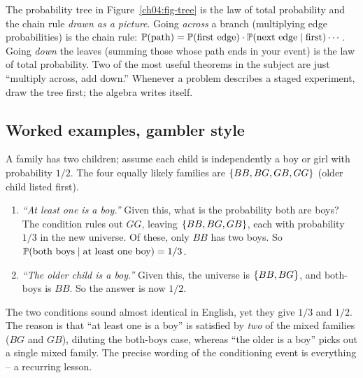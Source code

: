 \begin{aestheticbox}
The probability tree in Figure~\ref{ch04:fig-tree} is the law of total probability and the chain rule \emph{drawn as a picture}. Going \emph{across} a branch (multiplying edge probabilities) is the chain rule: $\operatorname{\mathbb{P}}(\text{path}) = \operatorname{\mathbb{P}}(\text{first edge})\cdot\operatorname{\mathbb{P}}(\text{next edge}\mid \text{first})\cdots$. Going \emph{down} the leaves (summing those whose path ends in your event) is the law of total probability. Two of the most useful theorems in the subject are just ``multiply across, add down.'' Whenever a problem describes a staged experiment, draw the tree first; the algebra writes itself.
\end{aestheticbox}

\subsection{Worked examples, gambler style}

\begin{example}
\label{ch04:ex-two-children}
A family has two children; assume each child is independently a boy or girl with probability $1/2$. The four equally likely families are $\{BB, BG, GB, GG\}$ (older child listed first).
\begin{enumerate}
\item \emph{``At least one is a boy.''} Given this, what is the probability both are boys? The condition rules out $GG$, leaving $\{BB, BG, GB\}$, each with probability $1/3$ in the new universe. Of these, only $BB$ has two boys. So $\operatorname{\mathbb{P}}(\text{both boys}\mid \text{at least one boy}) = 1/3$.
\item \emph{``The older child is a boy.''} Given this, the universe is $\{BB, BG\}$, and both-boys is $BB$. So the answer is now $1/2$.
\end{enumerate}
The two conditions sound almost identical in English, yet they give $1/3$ and $1/2$. The reason is that ``at least one is a boy'' is satisfied by \emph{two} of the mixed families ($BG$ and $GB$), diluting the both-boys case, whereas ``the older is a boy'' picks out a single mixed family. The precise wording of the conditioning event is everything -- a recurring lesson.
\end{example}

